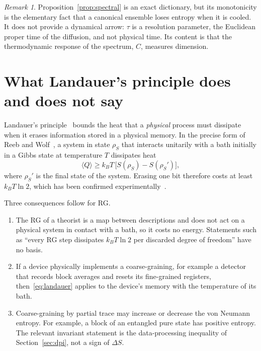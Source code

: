 \documentclass[11pt]{article}
\theoremstyle{remark}\newtheorem*{remark}{Remark}
\begin{document}
\begin{remark}
Proposition~\ref{prop:spectral} is an exact dictionary, but its monotonicity is the elementary fact that a canonical
ensemble loses entropy when it is cooled. It does not provide a dynamical arrow: $\tau$ is a resolution parameter,
the Euclidean proper time of the diffusion, and not physical time. Its content is that the thermodynamic response
of the spectrum, $C$, measures dimension.
\end{remark}

\section{What Landauer's principle does and does not say}
\label{sec:landauer}

Landauer's principle~\cite{Landauer,Bennett82} bounds the heat that a \emph{physical} process must dissipate when it
erases information stored in a physical memory. In the precise form of Reeb and Wolf~\cite{ReebWolf}, a system in
state $\rho_S$ that interacts unitarily with a bath initially in a Gibbs state at temperature $T$ dissipates heat
\begin{equation}
\langle Q\rangle\ge k_BT\,\bigl[S(\rho_S)-S(\rho_S')\bigr],
\label{eq:landauer}
\end{equation}
where $\rho_S'$ is the final state of the system. Erasing one bit therefore costs at least $k_BT\ln2$, which has been
confirmed experimentally~\cite{Berut}.

Three consequences follow for RG.
\begin{enumerate}
\item The RG of a theorist is a map between descriptions and does not act on a physical system in contact with a
bath, so it costs no energy. Statements such as ``every RG step dissipates $k_BT\ln2$ per discarded degree of
freedom'' have no basis.
\item If a device physically implements a coarse-graining, for example a detector that records block averages and
resets its fine-grained registers, then~\eqref{eq:landauer} applies to the device's memory with the temperature of
its bath.
\item Coarse-graining by partial trace may increase or decrease the von Neumann entropy. For example, a block of an
entangled pure state has positive entropy. The relevant invariant statement is the data-processing inequality of
Section~\ref{sec:dpi}, not a sign of $\Delta S$.
\end{enumerate}
\end{document}

